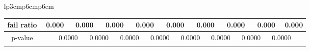 {\begin{tabular}{lp{3cm}p{6cm}p{6cm}}
\begin{tabular}[h]{m{2.5cm}m{}m{}m{}m{}m{}m{}m{}m{}m{}m{}m{}m{}m{}m{}m{}m{}m{}m{}}
\hline
\multicolumn{1}{c}{fail ratio}&\multicolumn{2}{c}{          0.000}&\multicolumn{2}{c}{    0.000}&\multicolumn{2}{c}{    0.000}&\multicolumn{2}{c}{    0.000}&\multicolumn{2}{c}{    0.000}&\multicolumn{2}{c}{    0.000}&\multicolumn{2}{c}{    0.000}&\multicolumn{2}{c}{    0.000}&\multicolumn{2}{c}{    0.000}\\
\hline
\multicolumn{1}{c}{p-value}&&\multicolumn{2}{c}{0.0000}&\multicolumn{2}{c}{0.0000}&\multicolumn{2}{c}{0.0000}&\multicolumn{2}{c}{0.0000}&\multicolumn{2}{c}{0.0000}&\multicolumn{2}{c}{0.0000}&\multicolumn{2}{c}{0.0000}&\multicolumn{2}{c}{0.0000}\\
&&&&&&&&&&&&&&&&&&\end{tabular}
\end{tabular}
}
